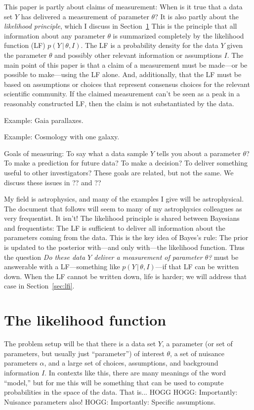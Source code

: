 \documentclass{article}
\newcommand{\sectionname}{Section}
\newcommand{\secref}[1]{\sectionname~\ref{#1}}
\newcommand{\given}{\,|\,}
\begin{document}
This paper is partly about claims of measurement:
When is it true that a data set $Y$ has delivered a measurement of parameter $\theta$?
It is also partly about the \emph{likelihood principle}, which I discuss in \secref{sec:lf}
This is the principle that all information about any parameter $\theta$ is summarized completely by the likelihood function (LF) $p(Y\given\theta, I)$.
The LF is a probability density for the data $Y$ given the parameter $\theta$ and possibly other relevant information or assumptions $I$.
The main point of this paper is that a claim of a measurement must be made---or be possible to make---using the LF alone.
And, additionally, that the LF must be based on assumptions or choices that represent consensus choices for the relevant scientific community.
If the claimed measurement can't be seen as a peak in a reasonably constructed LF, then the claim is not substantiated by the data.

Example: Gaia parallaxes.

Example: Cosmology with one galaxy.

Goals of measuring: To say what a data sample $Y$ tells you about a parameter $\theta$? To make a prediction for future data? To make a decision? To deliver something useful to other investigators? These goals are related, but not the same. We discuss these issues in ?? and ??

My field is astrophysics, and many of the examples I give will be astrophysical.
The document that follows will seem to many of my astrophysics colleagues as very frequentist.
It isn't!
The likelihood principle is shared between Bayesians and frequentists:
The LF is sufficient to deliver all information about the parameters coming from the data.
This is the key idea of Bayes's rule:
The prior is updated to the posterior with---and only with---the likelihood function.
Thus the question \emph{Do these data $Y$ deliver a measurement of parameter $\theta$?} must be answerable with a LF---something like $p(Y\given\theta,I)$---if that LF can be written down.
When the LF cannot be written down, life is harder; we will address that case in \secref{sec:lfi}.

\section{The likelihood function}\label{sec:lf}
The problem setup will be that there is a data set $Y$, a parameter (or set of parameters, but usually just ``parameter'') of interest $\theta$, a set of nuisance parameters $\alpha$, and a large set of choices, assumptions, and background information $I$.
In contexts like this, there are many meanings of the word ``model,'' but for me this will be something that can be used to compute probabilities in the space of the data.
That is... HOGG
HOGG: Importantly: Nuisance parameters also!
HOGG: Importantly: Specific assumptions.
\end{document}
